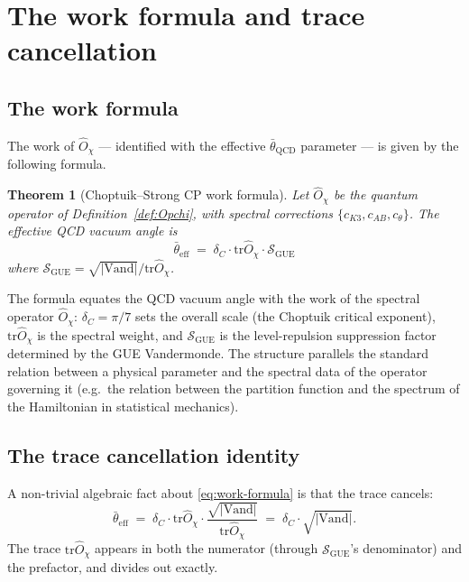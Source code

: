 \documentclass[11pt,a4paper]{article}
\newcommand{\dC}{\delta_C}
\newcommand{\Opchi}{\hat{O}_\chi}
\providecommand{\tr}{}
\renewcommand{\tr}{\mathrm{tr}}
\theoremstyle{plain}
\newtheorem{theorem}{Theorem}[section]
\theoremstyle{definition}
\theoremstyle{remark}
\begin{document}
\section{The work formula and trace cancellation}
\label{sec:work-formula}

\subsection{The work formula}

The work of $\Opchi$ --- identified with the effective
$\bar\theta_{\mathrm{QCD}}$ parameter --- is given by the following
formula.

\begin{theorem}[Choptuik--Strong CP work formula]\label{thm:work}
Let $\Opchi$ be the quantum operator of Definition~\ref{def:Opchi},
with spectral corrections $\{c_{K3}, c_{AB}, c_\theta\}$.  The
effective QCD vacuum angle is
\begin{equation}\label{eq:work-formula}
  \bar\theta_{\mathrm{eff}}
  \;=\; \dC \cdot \tr\Opchi \cdot \mathcal{S}_{\mathrm{GUE}}
\end{equation}
where $\mathcal{S}_{\mathrm{GUE}} = \sqrt{|\mathrm{Vand}|}/\tr\Opchi$.
\end{theorem}

The formula equates the QCD vacuum angle with the work of the
spectral operator $\Opchi$: $\dC = \pi/7$ sets the overall scale
(the Choptuik critical exponent), $\tr\Opchi$ is the spectral
weight, and $\mathcal{S}_{\mathrm{GUE}}$ is the level-repulsion
suppression factor determined by the GUE Vandermonde.  The
structure parallels the standard relation between a physical
parameter and the spectral data of the operator governing it
(e.g.\ the relation between the partition function and the
spectrum of the Hamiltonian in statistical mechanics).

\subsection{The trace cancellation identity}

A non-trivial algebraic fact about \eqref{eq:work-formula} is that
the trace cancels:
\begin{equation}\label{eq:trace-cancel}
  \bar\theta_{\mathrm{eff}}
  \;=\; \dC \cdot \tr\Opchi \cdot \frac{\sqrt{|\mathrm{Vand}|}}{\tr\Opchi}
  \;=\; \dC \cdot \sqrt{|\mathrm{Vand}|}.
\end{equation}
The trace $\tr\Opchi$ appears in both the numerator (through
$\mathcal{S}_{\mathrm{GUE}}$'s denominator) and the prefactor, and
divides out exactly.
\end{document}
